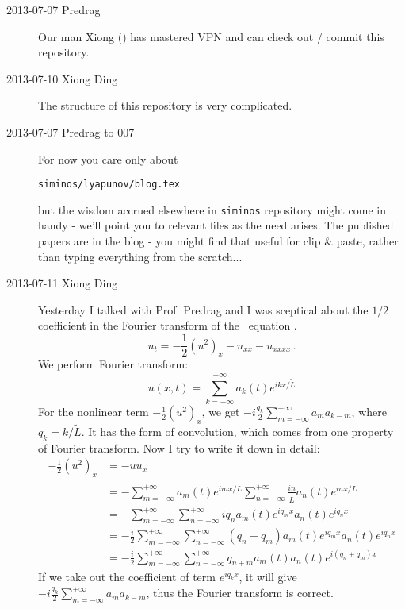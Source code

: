\begin{description}
\item[2013-07-07 Predrag] Our man Xiong
()
has mastered VPN and can check out / commit this repository.

\item[2013-07-10 Xiong Ding]
The structure of this repository is very complicated.

\item[2013-07-07 Predrag to 007] For now you care only about
\begin{verbatim}
siminos/lyapunov/blog.tex
\end{verbatim}
 but the wisdom accrued
elsewhere in \texttt{siminos} repository might come in handy -
we'll point you to relevant files as the need arises. The
published papers are in the blog - you might find that useful
for clip \& paste, rather than typing everything from the scratch...

\item[2013-07-11 Xiong Ding] Yesterday I talked with Prof. Predrag and I was
sceptical about the $1/2$ coefficient in the Fourier transform
 of the \KS\
equation .
\[
 u_t=-\frac{1}{2}(u^2)_x-u_{xx}-u_{xxxx}
 \,.
\]
We perform Fourier transform:
\[
 u(x,t)=\sum_{k=-\infty}^{+\infty} a_{k}(t)e^{ikx/\tilde{L}}
\]
For the nonlinear term $-\frac{1}{2}(u^2)_x$, we get
$-i\frac{q_k}{2}\sum_{m=-\infty}^{+\infty} a_{m}a_{k-m}$,
where $q_k=k/\tilde{L}$. It has the form of
convolution, which comes from one property of Fourier transform.
Now I try to write it down in detail:
\begin{align*}
 -\frac{1}{2}(u^2)_x &=-uu_x \\
 &=-\sum_{m=-\infty}^{+\infty} a_{m}(t)e^{imx/\tilde{L}}
 \sum_{n=-\infty}^{+\infty} \frac{in}{\tilde{L}} a_{n}(t)e^{inx/\tilde{L}}\\
 &=-\sum_{m=-\infty}^{+\infty}\sum_{n=-\infty}^{+\infty} iq_{n} a_{m}(t)e^{iq_{m}x}a_{n}(t)e^{iq_{n}x}\\
 &=-\frac{i}{2}\sum_{m=-\infty}^{+\infty}\sum_{n=-\infty}^{+\infty}
 (q_{n}+q_m) a_{m}(t)e^{iq_{m}x}a_{n}(t)e^{iq_{n}x}\\
 &=-\frac{i}{2}\sum_{m=-\infty}^{+\infty}\sum_{n=-\infty}^{+\infty} q_{n+m} a_{m}(t)a_{n}(t)e^{i(q_{n}+q_m)x}
\end{align*}
If we take out the coefficient of term $e^{iq_{k}x}$, it will give
$-i\frac{q_k}{2}\sum_{m=-\infty}^{+\infty} a_{m}a_{k-m}$, thus the
Fourier transform \refeq{expan} is correct.


\end{description}
